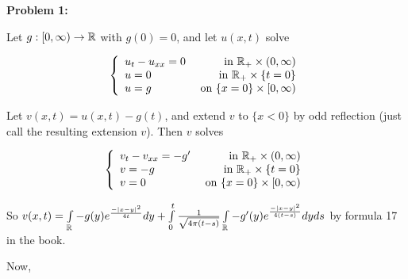 \documentclass[a4paper,12pt]{article}
\begin{document}
{\bf Problem 1:}

Let $g: [0,\infty) \to \mathbb{R}$ with $g(0) = 0$, and let $u(x,t)$ solve

\begin{displaymath}
   \left\{
     \begin{array}{lr}
       u_t - u_{xx} = 0 & \text{ in } \mathbb{R}_+ \times (0,\infty) \\
       u=0 & \text{ in } \mathbb{R}_+ \times \{t=0\}\\
       u=g & \text{ on } \{x=0\} \times [0,\infty)
     \end{array}
   \right.
\end{displaymath}

Let $v(x,t) = u(x,t) - g(t)$, and extend $v$ to $\{x<0\}$ by odd reflection (just call the resulting extension $v$). Then $v$ solves

\begin{displaymath}
   \left\{
     \begin{array}{lr}
       v_t - v_{xx} = -g' & \text{ in } \mathbb{R}_+ \times (0,\infty) \\
       v=-g & \text{ in } \mathbb{R}_+ \times \{t=0\}\\
       v=0 & \text{ on } \{x=0\} \times [0,\infty)
     \end{array}
   \right.
\end{displaymath} %

So $v(x,t) = \int\limits_{\mathbb{R}} -g(y)e^{\frac{-\left\lvert x-y \right\rvert^2}{4t}} dy +  \int\limits_0^t \frac{1}{\sqrt{4 \pi (t-s)}} \int\limits_{\mathbb{R}} -g'(y) e^{\frac{-\left\lvert x-y \right\rvert^2}{4(t-s)}} dy ds$ by formula 17 in the book.

Now,
\end{document}
